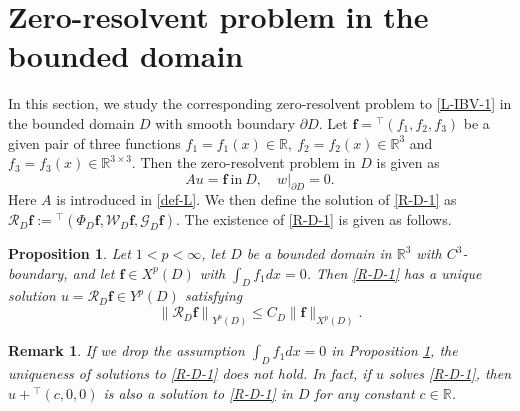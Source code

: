 \documentclass[dvipdfmx,12pt]{article}
\newtheorem{prop}[dfn]{Proposition}
\newtheorem{rem}[dfn]{Remark}
\begin{document}
\section{Zero-resolvent problem in the bounded domain} 
In this section, we study the corresponding zero-resolvent problem to \eqref{L-IBV-1} in the bounded domain $D$ with smooth boundary $\partial D$. Let $\mathbf{f}={}^\top(f_1,f_2,f_3)$ be a given pair of three functions $f_1=f_1(x)\in\mathbb{R},~f_2=f_2(x)\in\mathbb{R}^3$ and $f_3=f_3(x)\in\mathbb{R}^{3\times3}$. Then the zero-resolvent problem in $D$ is given as
\begin{equation}
\label{R-D-1}
A u=\mathbf{f}~\mathrm{in}~D,\quad
w|_{\partial D}=0.
\end{equation}
Here  $A$ is introduced in \eqref{def-L}. We then define the solution of \eqref{R-D-1} as $\mathcal{R}_{D}\mathbf{f}:={}^\top(\Phi_{D}\mathbf{f},\mathcal{W}_{D}\mathbf{f},\mathcal{G}_{D}\mathbf{f})$. The existence of \eqref{R-D-1} is given as follows.
\begin{prop}\label{R-D-prop2}
Let  $1<p<\infty$, let $D$ be a bounded domain in $\mathbb{R}^3$ with $C^3$-boundary, and let $\mathbf{f}\in X^p(D)$ with $\int_D f_1 dx=0$. Then \eqref{R-D-1} has a unique solution $u=\mathcal{R}_{D}\mathbf{f}\in Y^p(D)$ satisfying 
\begin{equation}
\left\|\mathcal{R}_D\mathbf{f}\right\|_{Y^p(D)}\leq 
C_{D}\|\mathbf{f}\|_{X^p(D)}.
\end{equation}
\end{prop}

\begin{rem}\label{R-D-rem1}
If we drop the assumption $\int_D f_1 dx=0$ in Proposition \ref{R-D-prop2}, the uniqueness of solutions to \eqref{R-D-1} does not  hold. In fact, if $u$ solves \eqref{R-D-1}, then $u+{}^\top (c,0,0)$ is also a solution to \eqref{R-D-1} in $D$ for any constant $c\in\mathbb{R}$.
\end{rem}
\end{document}
